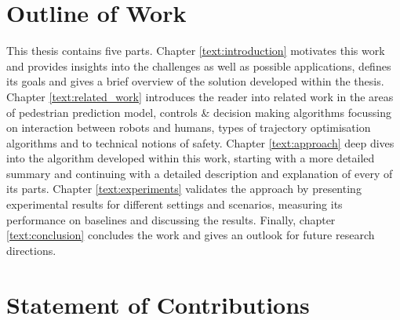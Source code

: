 \section{Outline of Work}
\label{text:introduction/outline}
This thesis contains five parts. Chapter \ref{text:introduction} motivates this work and provides insights into the challenges as well as possible applications, defines its goals and gives a brief overview of the solution developed within the thesis. Chapter \ref{text:related_work} introduces the reader into related work in the areas of pedestrian prediction model, controls \& decision making algorithms focussing on interaction between robots and humans, types of trajectory optimisation algorithms and to technical notions of safety. Chapter \ref{text:approach} deep dives into the algorithm developed within this work, starting with a more detailed summary and continuing with a detailed description and explanation of every of its parts. Chapter \ref{text:experiments} validates the approach by presenting experimental results for different settings and scenarios, measuring its performance on baselines and discussing the results. Finally, chapter \ref{text:conclusion} concludes the work and gives an outlook for future research directions.

\section{Statement of Contributions}
\label{text:introduction/contributions}

